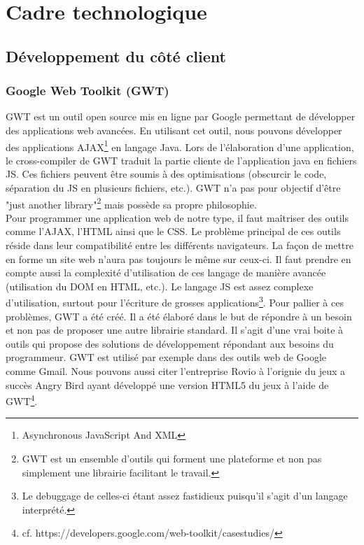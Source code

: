 
\chapter{Cadre technologique}


\section{Développement du côté client}
\subsection{Google Web Toolkit (GWT)}

GWT est un outil open source mis en ligne par Google permettant de développer des applications web avancées. En utilisant cet outil, nous pouvons développer des applications AJAX\footnote{Asynchronous JavaScript And XML} en langage Java.
Lors de l'élaboration d'une application, le cross-compiler de GWT traduit la partie cliente de l'application java en 
fichiers JS. Ces fichiers peuvent être soumis à des optimisations (obscurcir le code, séparation du JS en plusieurs fichiers, etc.). GWT n'a pas pour objectif d'être "just another library"\footnote{GWT est un ensemble d'outils qui forment une plateforme et non pas simplement une librairie facilitant le travail.} mais possède sa propre philosophie.\\
\newline
\indent
Pour programmer une application web de notre type, il faut maîtriser des outils comme l'AJAX, l'HTML ainsi que le CSS. Le problème principal de ces outils réside dans leur compatibilité entre les différents navigateurs. La façon de mettre en forme un site web n'aura pas toujours le même sur ceux-ci. Il faut prendre en compte aussi la complexité d'utilisation de ces langage de manière avancée (utilisation du DOM en HTML, etc.). Le langage JS est assez complexe d'utilisation, surtout pour l'écriture de grosses applications\footnote{Le debuggage de celles-ci étant assez fastidieux puisqu'il s'agit d'un langage interprété.}.
\newline
\indent
Pour pallier à ces problèmes, GWT a été créé. Il a été élaboré dans le but de répondre à un besoin et non pas de proposer une autre librairie standard. Il s'agit d'une vrai boite à outils qui propose des solutions de développement répondant aux besoins du programmeur.
\newline
\indent
GWT est utilisé par exemple dans des outils web de Google comme Gmail. Nous pouvons aussi citer l'entreprise Rovio à l'orignie du jeux a succès Angry Bird ayant développé une version HTML5 du jeux à l'aide de GWT\footnote{cf. https://developers.google.com/web-toolkit/casestudies/}.

